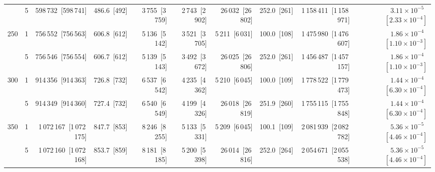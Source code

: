 \begin{tabular}{llrrrrrrrr}
 & 5 & 598\,732~{\footnotesize[598\,741]} & 486.6~{\footnotesize[492]} & 3\,755~{\footnotesize[3\,759]} & 2\,743~{\footnotesize[2\,902]} & 26\,032~{\footnotesize[26\,802]} & 252.0~{\footnotesize[261]} & 1\,158\,411~{\footnotesize[1\,158\,971]} & $3.11\!\times\!10^{-5}$~{\footnotesize $[2.33\!\times\!10^{-4}]$} \\
\cline{1-10}
\multirow[t]{2}{*}{250} & 1 & 756\,552~{\footnotesize[756\,563]} & 606.8~{\footnotesize[612]} & 5\,136~{\footnotesize[5\,142]} & 3\,521~{\footnotesize[3\,705]} & 5\,211~{\footnotesize[6\,031]} & 100.0~{\footnotesize[108]} & 1\,475\,980~{\footnotesize[1\,476\,607]} & $1.86\!\times\!10^{-4}$~{\footnotesize $[1.10\!\times\!10^{-3}]$} \\
 & 5 & 756\,546~{\footnotesize[756\,554]} & 606.7~{\footnotesize[612]} & 5\,139~{\footnotesize[5\,143]} & 3\,492~{\footnotesize[3\,672]} & 26\,025~{\footnotesize[26\,806]} & 252.0~{\footnotesize[261]} & 1\,456\,487~{\footnotesize[1\,457\,157]} & $1.86\!\times\!10^{-4}$~{\footnotesize $[1.10\!\times\!10^{-3}]$} \\
\cline{1-10}
\multirow[t]{2}{*}{300} & 1 & 914\,356~{\footnotesize[914\,363]} & 726.8~{\footnotesize[732]} & 6\,537~{\footnotesize[6\,542]} & 4\,235~{\footnotesize[4\,362]} & 5\,210~{\footnotesize[6\,045]} & 100.0~{\footnotesize[109]} & 1\,778\,522~{\footnotesize[1\,779\,473]} & $1.44\!\times\!10^{-4}$~{\footnotesize $[6.30\!\times\!10^{-4}]$} \\
 & 5 & 914\,349~{\footnotesize[914\,360]} & 727.4~{\footnotesize[732]} & 6\,540~{\footnotesize[6\,549]} & 4\,199~{\footnotesize[4\,326]} & 26\,018~{\footnotesize[26\,819]} & 251.9~{\footnotesize[260]} & 1\,755\,115~{\footnotesize[1\,755\,848]} & $1.44\!\times\!10^{-4}$~{\footnotesize $[6.30\!\times\!10^{-4}]$} \\
\cline{1-10}
\multirow[t]{2}{*}{350} & 1 & 1\,072\,167~{\footnotesize[1\,072\,175]} & 847.7~{\footnotesize[853]} & 8\,246~{\footnotesize[8\,255]} & 5\,133~{\footnotesize[5\,331]} & 5\,209~{\footnotesize[6\,045]} & 100.1~{\footnotesize[109]} & 2\,081\,939~{\footnotesize[2\,082\,782]} & $5.36\!\times\!10^{-5}$~{\footnotesize $[4.46\!\times\!10^{-4}]$} \\
 & 5 & 1\,072\,160~{\footnotesize[1\,072\,168]} & 853.7~{\footnotesize[859]} & 8\,181~{\footnotesize[8\,185]} & 5\,200~{\footnotesize[5\,398]} & 26\,014~{\footnotesize[26\,816]} & 252.0~{\footnotesize[264]} & 2\,054\,671~{\footnotesize[2\,055\,538]} & $5.36\!\times\!10^{-5}$~{\footnotesize $[4.46\!\times\!10^{-4}]$} \\
\cline{1-10}

\end{tabular}
